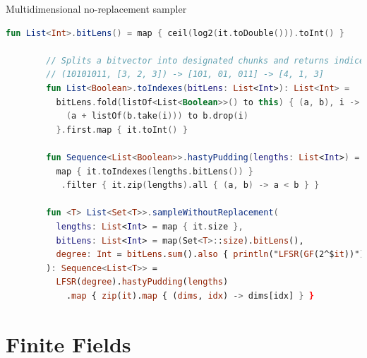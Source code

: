 \documentclass{beamer}
\begin{document}
    \begin{frame}[fragile]{Multidimensional no-replacement sampler}
        \begin{lstlisting}[language=Kotlin, gobble=8]
        fun List<Int>.bitLens() = map { ceil(log2(it.toDouble())).toInt() }

        // Splits a bitvector into designated chunks and returns indices
        // (10101011, [3, 2, 3]) -> [101, 01, 011] -> [4, 1, 3]
        fun List<Boolean>.toIndexes(bitLens: List<Int>): List<Int> =
          bitLens.fold(listOf<List<Boolean>>() to this) { (a, b), i ->
            (a + listOf(b.take(i))) to b.drop(i)
          }.first.map { it.toInt() }

        fun Sequence<List<Boolean>>.hastyPudding(lengths: List<Int>) =
          map { it.toIndexes(lengths.bitLens()) }
           .filter { it.zip(lengths).all { (a, b) -> a < b } }

        fun <T> List<Set<T>>.sampleWithoutReplacement(
          lengths: List<Int> = map { it.size },
          bitLens: List<Int> = map(Set<T>::size).bitLens(),
          degree: Int = bitLens.sum().also { println("LFSR(GF(2^$it))") }
        ): Sequence<List<T>> =
          LFSR(degree).hastyPudding(lengths)
            .map { zip(it).map { (dims, idx) -> dims[idx] } }
        \end{lstlisting}
    \end{frame}

    \section{Finite Fields}\label{sec:finite-fields}
\end{document}
